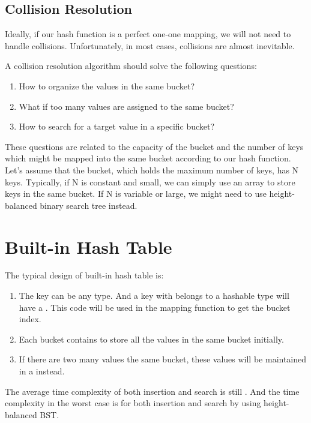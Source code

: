\subsection{Collision Resolution}
\label{sec:collision-resolution}

Ideally, if our hash function is a perfect one-one mapping, we will not need to handle collisions.
Unfortunately, in most cases, collisions are almost inevitable.

A collision resolution algorithm should solve the following questions:
\begin{enumerate}
\item How to organize the values in the same bucket?
\item What if too many values are assigned to the same bucket?
\item How to search for a target value in a specific bucket?
\end{enumerate}

These questions are related to the capacity of the bucket and the number of keys which might be mapped into the same bucket according to our hash function. 
Let's assume that the bucket, which holds the maximum number of keys, has N keys.
Typically, if N is constant and small, we can simply use an array to store keys in the same bucket.
If N is variable or large, we might need to use height-balanced binary search tree instead.

 





\section{Built-in Hash Table}

The typical design of built-in hash table is:
\begin{enumerate}
\item The key can be any  type. And a key with belongs to a hashable type will have a . This code will be used in the mapping function to get the bucket index.
\item Each bucket contains  to store all the values in the same bucket initially.
\item If there are two many values the same bucket, these values will be maintained in a  instead.
\end{enumerate}

The average time complexity of both insertion and search is still .
And the time complexity in the worst case is  for both insertion and search by using height-balanced BST.



